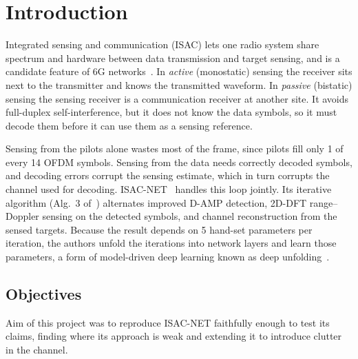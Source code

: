 \documentclass[11pt,a4paper]{article}
\begin{document}
\vspace{8pt}
{\setcounter{tocdepth}{1}\small\tableofcontents}
\newpage

\section{Introduction}
Integrated sensing and communication (ISAC) lets one radio system share spectrum and hardware between data transmission and target sensing, and is a candidate feature of 6G networks~\cite{isacnet,zhang2022}. In \emph{active} (monostatic) sensing the receiver sits next to the transmitter and knows the transmitted waveform. In \emph{passive} (bistatic) sensing the sensing receiver is a communication receiver at another site. It avoids full-duplex self-interference, but it does not know the data symbols, so it must decode them before it can use them as a sensing reference.

Sensing from the pilots alone wastes most of the frame, since pilots fill only 1 of every 14 OFDM symbols. Sensing from the data needs correctly decoded symbols, and decoding errors corrupt the sensing estimate, which in turn corrupts the channel used for decoding. ISAC-NET~\cite{isacnet} handles this loop jointly. Its iterative algorithm (Alg.~3 of~\cite{isacnet}) alternates improved D-AMP detection, 2D-DFT range--Doppler sensing on the detected symbols, and channel reconstruction from the sensed targets. Because the result depends on 5 hand-set parameters per iteration, the authors unfold the iterations into network layers and learn those parameters, a form of model-driven deep learning known as deep unfolding~\cite{oampnet}.

\subsection{Objectives}
Aim of this project was to reproduce ISAC-NET faithfully enough to test its claims, finding where its approach is weak and extending it to introduce clutter in the channel.
\end{document}
